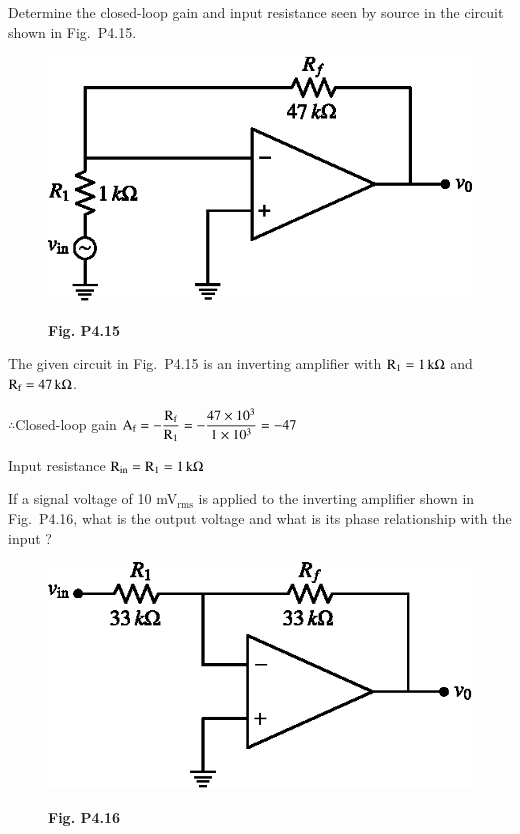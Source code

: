 \begin{problem}\label{prob4.15}
Determine the closed-loop gain and input resistance seen by source in the circuit shown in Fig.~P4.15.
\begin{figure}[H]
\centering
\includegraphics{chap4/figP4.15.eps}

\smallskip
{\bf Fig. P4.15}
\end{figure}
\end{problem}

\begin{solution}
The given circuit in Fig.~P4.15 is an inverting amplifier with $\textrm{R}_{1}=1\,\textrm{k}\Omega$ and $\textrm{R}_{\textrm{f}}=47\, \textrm{k}\Omega$.

$\therefore$\quad Closed-loop gain $\textrm{A}_{\textrm{f}}=-\dfrac{\textrm{R}_{\textrm{f}}}{\textrm{R}_{1}}=-\dfrac{47\times 10^{3}}{1\times 10^{3}}=-47$

\medskip
Input resistance $\textrm{R}_{\text{in}}=\textrm{R}_{1}=1\,\textrm{k}\Omega$
\end{solution}

\begin{problem}\label{prob4.16}
If a signal voltage of 10 mV$_{\text{rms}}$ is applied to the inverting amplifier shown in Fig.~P4.16, what is the output voltage and what is its phase relationship with the input ?
\begin{figure}[H]
\centering
\includegraphics{chap4/figP4.16.eps}

\smallskip
{\bf Fig. P4.16}
\end{figure}
\end{problem}


